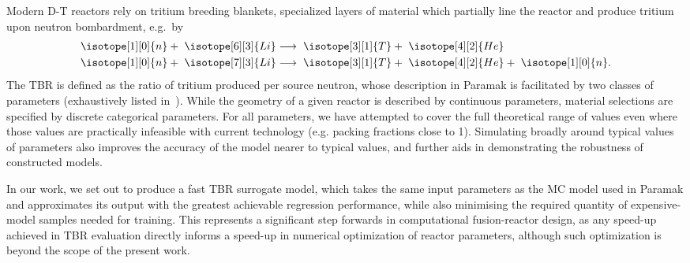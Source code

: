 Modern D-T reactors rely on tritium breeding blankets, specialized
layers of material which partially line the reactor and produce tritium upon
neutron bombardment, e.g.~by 
\begin{eqnarray}
	\isotope[1][0]{n} + \hspace{3pt} \isotope[6][3]{Li} 
	&\longrightarrow \hspace{3pt} 
	\isotope[3][1]{T} + \hspace{3pt}\isotope[4][2]{He} \\
	\isotope[1][0]{n} + \hspace{3pt} \isotope[7][3]{Li} 
	&\longrightarrow \hspace{3pt} 
	\isotope[3][1]{T} + \hspace{3pt} \isotope[4][2]{He} + \hspace{3pt} \isotope[1][0]{n}.
\end{eqnarray}%
%
The TBR is defined as the ratio of tritium produced per source neutron, whose description in Paramak is facilitated by two classes of parameters
(exhaustively listed in~). While the geometry of a given
reactor is described by continuous parameters, material selections are specified
by discrete categorical parameters. For all parameters, we have attempted to cover the full theoretical range of values even where those values are practically infeasible with current technology (e.g. packing fractions close to 1). Simulating broadly around typical values of parameters also improves the accuracy of the model nearer to typical values, and further aids in demonstrating the robustness of constructed models.

In our work, we set out to produce a fast TBR surrogate model, which takes the same input parameters as the MC model used in Paramak and approximates its output with the greatest achievable regression performance, while also minimising the required quantity of expensive-model samples needed for training. This represents a significant step forwards in computational fusion-reactor design, as any speed-up achieved in TBR evaluation directly informs a speed-up in numerical optimization of reactor parameters, although such optimization is beyond the scope of the present work.


